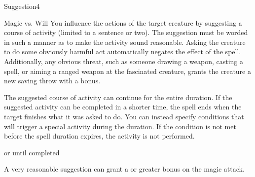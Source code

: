 \begin{spellsection}{Suggestion}{4}
\begin{spellheader}
    \begin{spelltargetinginfo}
    \end{spelltargetinginfo}
\end{spellheader}
\begin{spellcontent}
    \begin{spelleffects}
        \begin{spellattack}{Magic vs. Will}
            \spelleffect You influence the actions of the target creature by suggesting a course of activity (limited to a sentence or two). The suggestion must be worded in such a manner as to make the activity sound reasonable. Asking the creature to do some obviously harmful act automatically negates the effect of the spell. Additionally, any obvious threat, such as someone drawing a weapon, casting a spell, or aiming a ranged weapon at the fascinated creature, grants the creature a new saving throw with a  bonus.
            \par The suggested course of activity can continue for the entire duration. If the suggested activity can be completed in a shorter time, the spell ends when the target finishes what it was asked to do. You can instead specify conditions that will trigger a special activity during the duration. If the condition is not met before the spell duration expires, the activity is not performed.
        \end{spellattack}
        \spelldur \durext or until completed
    \end{spelleffects}
\end{spellcontent}
\begin{spellfooter}
    \spellnotes A very reasonable suggestion can grant a  or greater bonus on the magic attack.

    \norepeatspellnotes
\end{spellfooter}
\end{spellsection}

